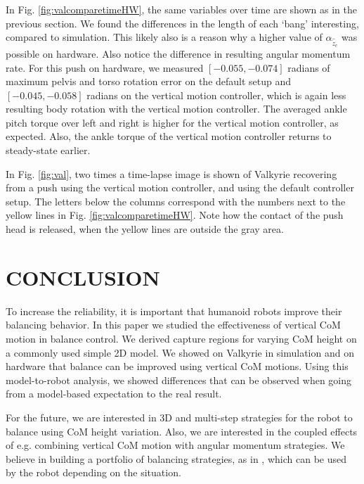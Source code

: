 \documentclass[letterpaper, 10 pt, conference]{ieeeconf}  %
\begin{document}
In Fig. \ref{fig:valcomparetimeHW}, the same variables over time are shown as in the previous section. 
We found the differences in the length of each `bang' interesting, compared to simulation. This likely also is a reason why a higher value of $\alpha_{\hat{\ddot{z}}_{c}}$ was possible on hardware. Also notice the difference in resulting angular momentum rate. For this push on hardware, we measured $[-0.055,-0.074]$ radians of maximum pelvis and torso rotation error on the default setup and $[-0.045,-0.058]$ radians on the vertical motion controller, which is again less resulting body rotation with the vertical motion controller. The averaged ankle pitch torque over left and right is higher for the vertical motion controller, as expected. Also, the ankle torque of the vertical motion controller returns to steady-state earlier.

In Fig. \ref{fig:val}, two times a time-lapse image is shown of Valkyrie recovering from a push using the vertical motion controller, and using the default controller setup. The letters below the columns correspond with the numbers next to the yellow lines in Fig. \ref{fig:valcomparetimeHW}. Note how the contact of the push head is released, when the yellow lines are outside the gray area.

\section{CONCLUSION}\label{sec:conclusion}
To increase the reliability, it is important that humanoid robots improve their balancing behavior. In this paper we studied the effectiveness of vertical CoM motion in balance control. We derived capture regions for varying CoM height on a commonly used simple 2D model. We showed on Valkyrie in simulation and on hardware that balance can be improved using vertical CoM motions. Using this model-to-robot analysis, we showed differences that can be observed when going from a model-based expectation to the real result. 

For the future, we are interested in 3D and multi-step strategies for the robot to balance using CoM height variation. Also, we are interested in the coupled effects of e.g. combining vertical CoM motion with angular momentum strategies. We believe in building a portfolio of balancing strategies, as in \cite{griffin2017walking}, which can be used by the robot depending on the situation.


\addtolength{\textheight}{-0cm}   %




\end{document}
